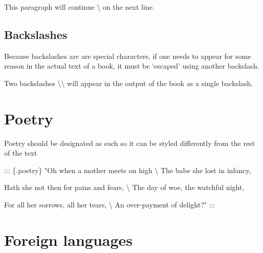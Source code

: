 \documentclass[
]{book}
\newenvironment{Shaded}{\begin{snugshade}}{\end{snugshade}}
\newcommand{\NormalTok}[1]{#1}
\newcommand{\SpecialCharTok}[1]{\textcolor[rgb]{0.00,0.00,0.00}{#1}}
\begin{document}
\begin{Shaded}
\begin{Highlighting}[]
\NormalTok{This paragraph will continue \textbackslash{}}
\NormalTok{on the next line.}
\end{Highlighting}
\end{Shaded}

\hypertarget{backslashes}{%
\subsection{Backslashes}\label{backslashes}}

Because backslashes are are special characters, if one needs to appear for some reason in the actual text of a book, it must be `escaped' using another backslash.

\begin{Shaded}
\begin{Highlighting}[]
\NormalTok{Two backslashes }\SpecialCharTok{\textbackslash{}\textbackslash{}}\NormalTok{ will appear in the output of the book as a single backslash.}
\end{Highlighting}
\end{Shaded}

\hypertarget{poetry}{%
\section{Poetry}\label{poetry}}

Poetry should be designated as such so it can be styled differently from the rest of the text

\begin{Shaded}
\begin{Highlighting}[]
\NormalTok{::: \{.poetry\}}
\NormalTok{"Oh when a mother meets on high \textbackslash{}}
\NormalTok{The babe she lost in infancy,}

\NormalTok{Hath she not then for pains and fears, \textbackslash{}}
\NormalTok{The day of woe, the watchful night,}

\NormalTok{For all her sorrows, all her tears, \textbackslash{}}
\NormalTok{An over{-}payment of delight?"}
\NormalTok{:::}
\end{Highlighting}
\end{Shaded}

\hypertarget{foreign-languages}{%
\section{Foreign languages}\label{foreign-languages}}
\end{document}
